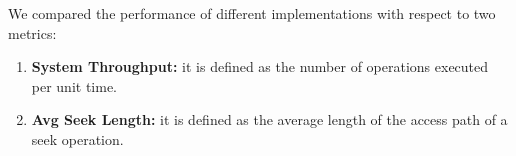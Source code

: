 We compared the performance of different implementations with respect to two metrics:
\begin{enumerate}
	\item \textbf{System Throughput:} it is defined as the number of operations executed per unit time.
	\item \textbf{Avg Seek Length:} it is defined as the average length of the access path of a seek operation.
\end{enumerate}
